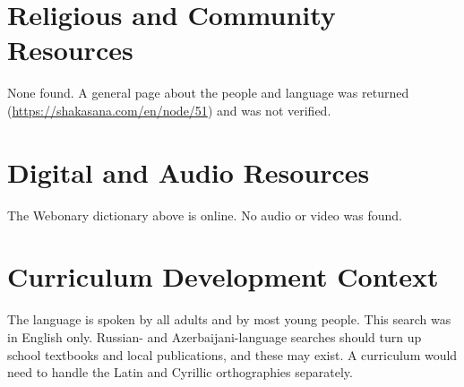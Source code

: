 \documentclass[12pt]{article}
\begin{document}
\section{Religious and Community Resources}
None found. A general page about the people and language was returned (\url{https://shakasana.com/en/node/51}) and was not verified.

\section{Digital and Audio Resources}
The Webonary dictionary above is online. No audio or video was found.

\section{Curriculum Development Context}
The language is spoken by all adults and by most young people. This search was in English only. Russian- and Azerbaijani-language searches should turn up school textbooks and local publications, and these may exist. A curriculum would need to handle the Latin and Cyrillic orthographies separately.
\end{document}
